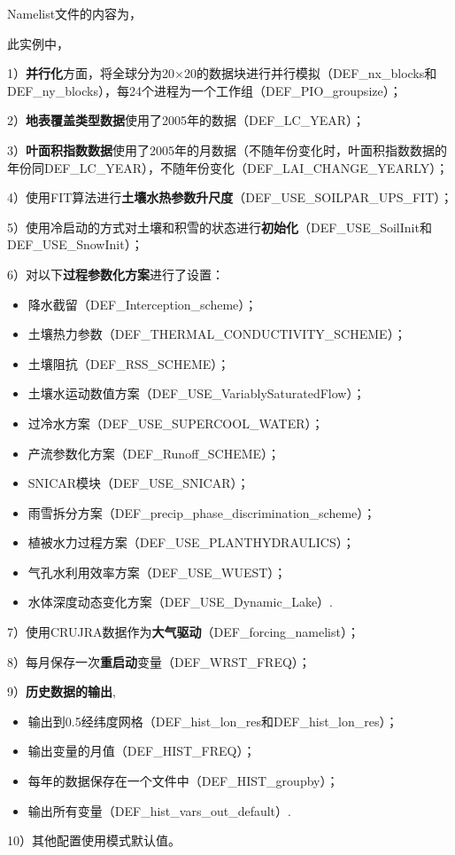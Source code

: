 \documentclass[a4paper,12pt,twoside]{article}
\begin{document}
Namelist文件的内容为，


此实例中，\par
1）\textbf{并行化}方面，将全球分为20\textdegree$\times$20\textdegree 的数据块进行并行模拟（DEF\_nx\_blocks和DEF\_ny\_blocks），每24个进程为一个工作组（DEF\_PIO\_groupsize）；\par
2）\textbf{地表覆盖类型数据}使用了2005年的数据（DEF\_LC\_YEAR）；\par
3）\textbf{叶面积指数数据}使用了2005年的月数据（不随年份变化时，叶面积指数数据的年份同DEF\_LC\_YEAR），不随年份变化（DEF\_LAI\_CHANGE\_YEARLY）；\par
4）使用FIT算法进行\textbf{土壤水热参数升尺度}（DEF\_USE\_SOILPAR\_UPS\_FIT）；\par
5）使用冷启动的方式对土壤和积雪的状态进行\textbf{初始化}（DEF\_USE\_SoilInit和DEF\_USE\_SnowInit）；\par
6）对以下\textbf{过程参数化方案}进行了设置：
\begin{itemize}[nosep,leftmargin=4em]
    \item 降水截留（DEF\_Interception\_scheme）；
    \item 土壤热力参数（DEF\_THERMAL\_CONDUCTIVITY\_SCHEME）；
    \item 土壤阻抗（DEF\_RSS\_SCHEME）；
    \item 土壤水运动数值方案（DEF\_USE\_VariablySaturatedFlow）；
    \item 过冷水方案（DEF\_USE\_SUPERCOOL\_WATER）；
    \item 产流参数化方案（DEF\_Runoff\_SCHEME）；
    \item SNICAR模块（DEF\_USE\_SNICAR）；
    \item 雨雪拆分方案（DEF\_precip\_phase\_discrimination\_scheme）；
    \item 植被水力过程方案（DEF\_USE\_PLANTHYDRAULICS）；
    \item 气孔水利用效率方案（DEF\_USE\_WUEST）；
    \item 水体深度动态变化方案（DEF\_USE\_Dynamic\_Lake）.
\end{itemize}
\par
7）使用CRUJRA数据作为\textbf{大气驱动}（DEF\_forcing\_namelist）；\par
8）每月保存一次\textbf{重启动}变量（DEF\_WRST\_FREQ）；\par
9）\textbf{历史数据的输出},
\begin{itemize}[nosep,leftmargin=4em]
    \item 输出到0.5\textdegree 经纬度网格（DEF\_hist\_lon\_res和DEF\_hist\_lon\_res）；
    \item 输出变量的月值（DEF\_HIST\_FREQ）；
    \item 每年的数据保存在一个文件中（DEF\_HIST\_groupby）；
    \item 输出所有变量（DEF\_hist\_vars\_out\_default）.
\end{itemize}\par
10）其他配置使用模式默认值。
\end{document}
